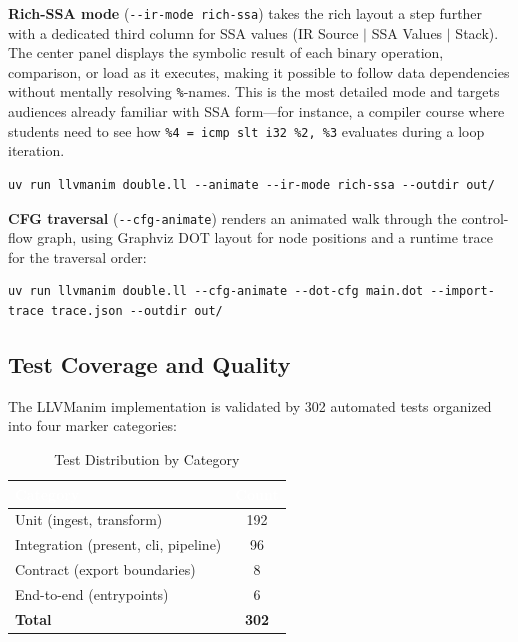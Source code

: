 \textbf{Rich-SSA mode} (\texttt{-{}-ir-mode rich-ssa}) takes the rich layout a step further with a dedicated third column for SSA values (IR Source $\mid$ SSA Values $\mid$ Stack). The center panel displays the symbolic result of each binary operation, comparison, or load as it executes, making it possible to follow data dependencies without mentally resolving \texttt{\%}-names. This is the most detailed mode and targets audiences already familiar with SSA form---for instance, a compiler course where students need to see how \texttt{\%4 = icmp slt i32 \%2, \%3} evaluates during a loop iteration.
\begin{verbatim}
uv run llvmanim double.ll --animate --ir-mode rich-ssa --outdir out/
\end{verbatim}

\textbf{CFG traversal} (\texttt{-{}-cfg-animate}) renders an animated walk through the control-flow graph, using Graphviz DOT layout for node positions and a runtime trace for the traversal order:
\begin{verbatim}
uv run llvmanim double.ll --cfg-animate --dot-cfg main.dot --import-trace trace.json --outdir out/
\end{verbatim}

\subsection{Test Coverage and Quality}
The LLVManim implementation is validated by 302 automated tests organized into four marker categories:

\begin{table}[htbp]
\caption{Test Distribution by Category}
\label{tab:tests}
\centering
\renewcommand{\arraystretch}{1.3}
\begin{tabularx}{\columnwidth}{|X|c|}
\hline
\rowcolor[HTML]{4472C4}
\textcolor{white}{\textbf{Category}} & \textcolor{white}{\textbf{Count}} \\ \hline
Unit (ingest, transform)        & 192 \\ \hline
Integration (present, cli, pipeline) & 96 \\ \hline
Contract (export boundaries)    & 8   \\ \hline
End-to-end (entrypoints)        & 6   \\ \hline
\textbf{Total}                  & \textbf{302} \\ \hline
\end{tabularx}
\end{table}

